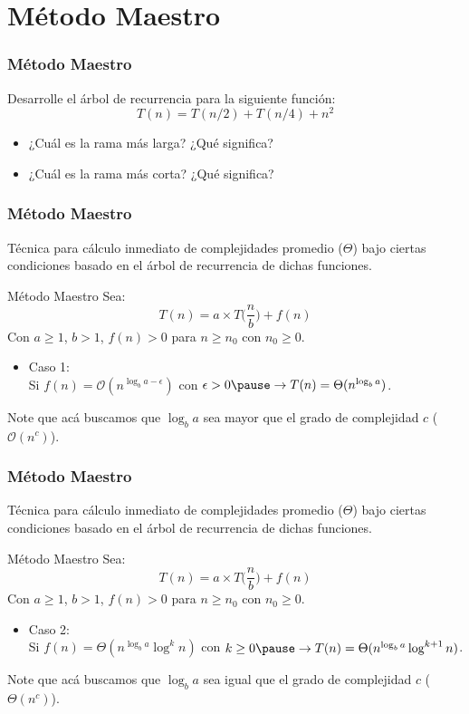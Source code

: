 \documentclass{beamer}
\begin{document}
\section{Método Maestro}
\begin{frame}[fragile]
 \frametitle{Método Maestro}
\small
Desarrolle el árbol de recurrencia para la siguiente función:
$$ T(n) = T(n/2) + T(n/4) + n^2 $$

\begin{itemize}
\item ¿Cuál es la rama más larga? ¿Qué significa?
\item ¿Cuál es la rama más corta? ¿Qué significa?
\end{itemize}
\end{frame}


\begin{frame}[fragile]
 \frametitle{Método Maestro}
\small Técnica para cálculo inmediato de complejidades promedio ($\Theta$) bajo ciertas condiciones basado en el árbol de recurrencia de dichas funciones.

\begin{block}{Método Maestro}
Sea: 
$$ T(n) = a \times T\Big(\frac{n}{b}\Big) + f(n) $$
Con $a \geq 1$, $b > 1$, $f(n) > 0 $ para $n \geq n_0$ con $n_0 \geq 0$. 
\begin{itemize}
\item Caso 1:\\
\smallskip
Si $f(n) = \mathcal{O}(n^{\log_b a - \epsilon})$ con $\epsilon > 0 \pause \rightarrow T(n) = \Theta(n^{\log_b a})$.
\end{itemize}
\end{block}
Note que acá buscamos que $\log_b a$ sea mayor que el grado de complejidad $c$ ($\mathcal{O}(n^c)$). 
\end{frame}

\begin{frame}[fragile]
 \frametitle{Método Maestro}
\small Técnica para cálculo inmediato de complejidades promedio ($\Theta$) bajo ciertas condiciones basado en el árbol de recurrencia de dichas funciones.

\begin{exampleblock}{Método Maestro}
Sea: 
$$ T(n) = a \times T\Big(\frac{n}{b}\Big) + f(n) $$
Con $a \geq 1$, $b > 1$, $f(n) > 0 $ para $n \geq n_0$ con $n_0 \geq 0$. 
\begin{itemize}
\item Caso 2:\\
\smallskip
Si $f(n) = \Theta(n^{\log_b a} \log^k n)$ con $k \geq 0 \pause \rightarrow T(n) = \Theta(n^{\log_b a} \log^{k+1} n)$.
\end{itemize}
\end{exampleblock}
Note que acá buscamos que $\log_b a$ sea igual que el grado de complejidad $c$ ($\Theta(n^c)$). 
\end{frame}
\end{document}
